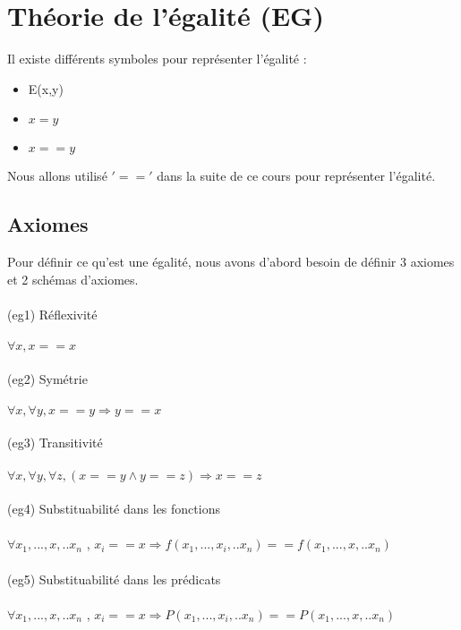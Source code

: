 \section{Théorie de l'égalité (EG)}
Il existe différents symboles pour représenter l'égalité : 
\begin{itemize}
	\item E(x,y)
	\item $x = y$
	\item $x == y $
\end{itemize}
Nous allons utilisé $'=='$ dans la suite de ce cours pour représenter l'égalité.

\subsection{Axiomes} 
Pour définir ce qu'est une égalité, nous avons d'abord besoin de définir 3 axiomes et 2 schémas d'axiomes.\\ \\
(eg1) Réflexivité \\ \\$\forall x, x==x$\\ \\
(eg2) Symétrie \\ \\$\forall x, \forall y, x==y \Rightarrow y==x$\\ \\
(eg3) Transitivité \\ \\$\forall x, \forall y, \forall z, (x==y \land y==z) \Rightarrow x==z$\\ \\
(eg4) Substituabilité dans les fonctions\\ \\$\forall x_{1}, ...,x, .. x_{n}$ ,  $x_{i}==x \Rightarrow f(x_{1}, ...,x_{i}, .. x_{n}) == f(x_{1}, ...,x, .. x_{n})$\\ \\
(eg5) Substituabilité dans les prédicats\\ \\$\forall x_{1}, ...,x, .. x_{n}$ ,  $x_{i}==x \Rightarrow P(x_{1}, ...,x_{i}, .. x_{n}) == P(x_{1}, ...,x, .. x_{n})$ \\ \\


